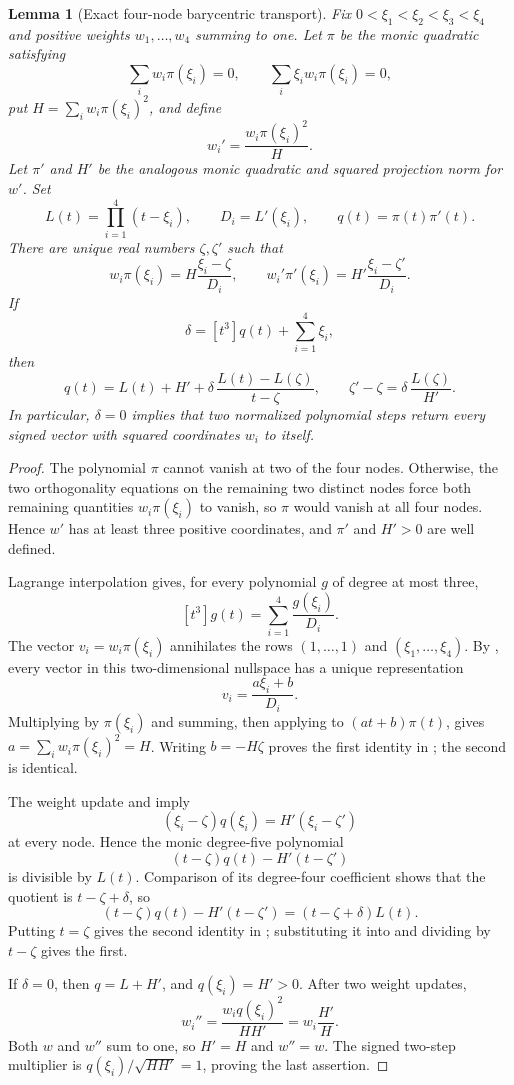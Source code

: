 \documentclass[11pt]{article}
\newtheorem{lemma}{Lemma}[section]
\begin{document}
\begin{lemma}[Exact four-node barycentric transport]
\label{lem:four-node-coordinate}
Fix \(0<\xi_1<\xi_2<\xi_3<\xi_4\) and positive weights
\(w_1,\ldots,w_4\) summing to one.  Let \(\pi\) be the monic quadratic
satisfying
\[
 \sum_iw_i\pi(\xi_i)=0,\qquad
 \sum_i\xi_iw_i\pi(\xi_i)=0,
\]
put \(H=\sum_iw_i\pi(\xi_i)^2\), and define
\[
 w_i'=\frac{w_i\pi(\xi_i)^2}{H}.
\]
Let \(\pi'\) and \(H'\) be the analogous monic quadratic and squared
projection norm for \(w'\).  Set
\[
 L(t)=\prod_{i=1}^4(t-\xi_i),\qquad
 D_i=L'(\xi_i),\qquad q(t)=\pi(t)\pi'(t).
\]
There are unique real numbers \(\zeta,\zeta'\) such that
\[
 w_i\pi(\xi_i)=H\frac{\xi_i-\zeta}{D_i},\qquad
 w_i'\pi'(\xi_i)=H'\frac{\xi_i-\zeta'}{D_i}.
\tag{11}\label{eq:four-node-barycentric}
\]
If
\[
 \delta=[t^3]q(t)+\sum_{i=1}^4\xi_i,
\]
then
\[
 q(t)=L(t)+H'
 +\delta\,\frac{L(t)-L(\zeta)}{t-\zeta},
\qquad
 \zeta'-\zeta=\delta\,\frac{L(\zeta)}{H'}.
\tag{12}\label{eq:four-node-transport}
\]
In particular, \(\delta=0\) implies that two normalized polynomial steps
return every signed vector with squared coordinates \(w_i\) to itself.
\end{lemma}

\begin{proof}
The polynomial \(\pi\) cannot vanish at two of the four nodes.  Otherwise,
the two orthogonality equations on the remaining two distinct nodes force
both remaining quantities \(w_i\pi(\xi_i)\) to vanish, so \(\pi\) would
vanish at all four nodes.  Hence \(w'\) has at least three positive
coordinates, and \(\pi'\) and \(H'>0\) are well defined.

Lagrange interpolation gives, for every polynomial \(g\) of degree at most
three,
\[
 [t^3]g(t)=\sum_{i=1}^4\frac{g(\xi_i)}{D_i}.
\tag{13}\label{eq:lagrange-leading}
\]
The vector \(v_i=w_i\pi(\xi_i)\) annihilates the rows
\((1,\ldots,1)\) and \((\xi_1,\ldots,\xi_4)\).  By
, every vector in this two-dimensional nullspace
has a unique representation
\[
 v_i=\frac{a\xi_i+b}{D_i}.
\]
Multiplying by \(\pi(\xi_i)\) and summing, then applying
 to \((at+b)\pi(t)\), gives
\(a=\sum_iw_i\pi(\xi_i)^2=H\).  Writing \(b=-H\zeta\) proves the first
identity in ; the second is identical.

The weight update and  imply
\[
 (\xi_i-\zeta)q(\xi_i)=H'(\xi_i-\zeta')
\]
at every node.  Hence the monic degree-five polynomial
\[
 (t-\zeta)q(t)-H'(t-\zeta')
\]
is divisible by \(L(t)\).  Comparison of its degree-four coefficient shows
that the quotient is \(t-\zeta+\delta\), so
\[
 (t-\zeta)q(t)-H'(t-\zeta')
 =(t-\zeta+\delta)L(t).
\tag{14}\label{eq:four-node-divisibility}
\]
Putting \(t=\zeta\) gives the second identity in
; substituting it into
 and dividing by \(t-\zeta\) gives the
first.

If \(\delta=0\), then \(q=L+H'\), and \(q(\xi_i)=H'>0\).  After two
weight updates,
\[
 w_i''=\frac{w_iq(\xi_i)^2}{HH'}=w_i\frac{H'}{H}.
\]
Both \(w\) and \(w''\) sum to one, so \(H'=H\) and \(w''=w\).  The signed
two-step multiplier is \(q(\xi_i)/\sqrt{HH'}=1\), proving the last
assertion.
\end{proof}
\end{document}
